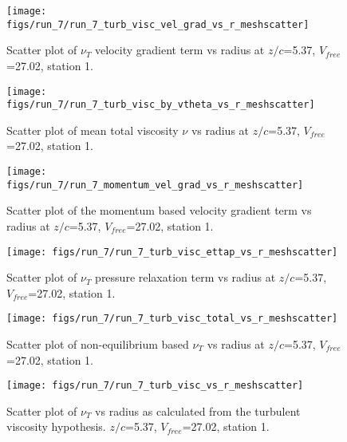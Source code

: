 \begin{figure}[H]
\centering
\texttt{[image: figs/run\_7/run\_7\_turb\_visc\_vel\_grad\_vs\_r\_meshscatter]}
\caption{Scatter plot of $\nu_T$ velocity gradient term vs radius at $z/c$=5.37, $V_{free}$=27.02, station 1.}
\end{figure}


\begin{figure}[H]
\centering
\texttt{[image: figs/run\_7/run\_7\_turb\_visc\_by\_vtheta\_vs\_r\_meshscatter]}
\caption{Scatter plot of mean total viscosity $\nu$ vs radius at $z/c$=5.37, $V_{free}$=27.02, station 1.}
\end{figure}


\begin{figure}[H]
\centering
\texttt{[image: figs/run\_7/run\_7\_momentum\_vel\_grad\_vs\_r\_meshscatter]}
\caption{Scatter plot of the momentum based velocity gradient term vs radius at $z/c$=5.37, $V_{free}$=27.02, station 1.}
\end{figure}


\begin{figure}[H]
\centering
\texttt{[image: figs/run\_7/run\_7\_turb\_visc\_ettap\_vs\_r\_meshscatter]}
\caption{Scatter plot of $\nu_T$ pressure relaxation term vs radius at $z/c$=5.37, $V_{free}$=27.02, station 1.}
\end{figure}


\begin{figure}[H]
\centering
\texttt{[image: figs/run\_7/run\_7\_turb\_visc\_total\_vs\_r\_meshscatter]}
\caption{Scatter plot of non-equilibrium based $\nu_T$ vs radius at $z/c$=5.37, $V_{free}$=27.02, station 1.}
\end{figure}


\begin{figure}[H]
\centering
\texttt{[image: figs/run\_7/run\_7\_turb\_visc\_vs\_r\_meshscatter]}
\caption{Scatter plot of $\nu_T$ vs radius as calculated from the turbulent viscosity hypothesis. $z/c$=5.37, $V_{free}$=27.02, station 1.}
\end{figure}



